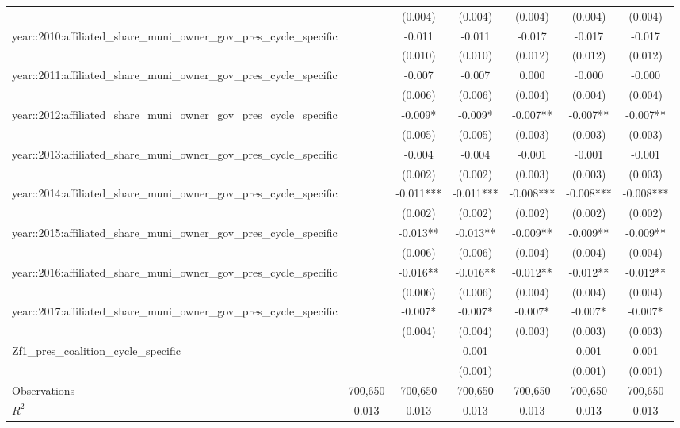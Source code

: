 {\begin{tabular}[t]{lcccccc}
 &  & (0.004) & (0.004) & (0.004) & (0.004) & (0.004)\\
year::2010:affiliated_share_muni_owner_gov_pres_cycle_specific &  & -0.011 & -0.011 & -0.017 & -0.017 & -0.017\\
 &  & (0.010) & (0.010) & (0.012) & (0.012) & (0.012)\\
year::2011:affiliated_share_muni_owner_gov_pres_cycle_specific &  & -0.007 & -0.007 & 0.000 & -0.000 & -0.000\\
 &  & (0.006) & (0.006) & (0.004) & (0.004) & \vphantom{2} (0.004)\\
year::2012:affiliated_share_muni_owner_gov_pres_cycle_specific &  & -0.009* & -0.009* & -0.007** & -0.007** & -0.007**\\
 &  & (0.005) & (0.005) & (0.003) & (0.003) & (0.003)\\
year::2013:affiliated_share_muni_owner_gov_pres_cycle_specific &  & -0.004 & -0.004 & -0.001 & -0.001 & -0.001\\
 &  & (0.002) & (0.002) & (0.003) & (0.003) & (0.003)\\
year::2014:affiliated_share_muni_owner_gov_pres_cycle_specific &  & -0.011*** & -0.011*** & -0.008*** & -0.008*** & -0.008***\\
 &  & (0.002) & (0.002) & (0.002) & (0.002) & (0.002)\\
year::2015:affiliated_share_muni_owner_gov_pres_cycle_specific &  & -0.013** & -0.013** & -0.009** & -0.009** & -0.009**\\
 &  & (0.006) & (0.006) & (0.004) & (0.004) & \vphantom{1} (0.004)\\
year::2016:affiliated_share_muni_owner_gov_pres_cycle_specific &  & -0.016** & -0.016** & -0.012** & -0.012** & -0.012**\\
 &  & (0.006) & (0.006) & (0.004) & (0.004) & (0.004)\\
year::2017:affiliated_share_muni_owner_gov_pres_cycle_specific &  & -0.007* & -0.007* & -0.007* & -0.007* & -0.007*\\
 &  & (0.004) & (0.004) & (0.003) & (0.003) & (0.003)\\
Zf1_pres_coalition_cycle_specific &  &  & 0.001 &  & 0.001 & 0.001\\
 &  &  & (0.001) &  & (0.001) & (0.001)\\
\midrule
Observations & 700,650 & 700,650 & 700,650 & 700,650 & 700,650 & 700,650\\
$R^2$ & 0.013 & 0.013 & 0.013 & 0.013 & 0.013 & 0.013\\
\bottomrule
\end{tabular}
}%
